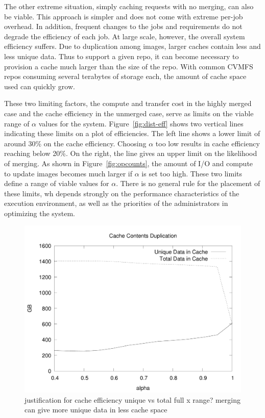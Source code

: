 \documentclass[sigconf]{acmart}
\begin{document}
The other extreme situation,
simply caching requests with no merging,
can also be viable.
This approach is simpler and does not come with extreme per-job overhead.
In addition, frequent changes to the jobs and requirements do not degrade the efficiency of each job.
At large scale, however,
the overall system efficiency suffers.
Due to duplication among images,
larger caches contain less and less unique data.
Thus to support a given repo,
it can become necessary to provision a cache much larger than the size of the repo.
With common CVMFS repos consuming several terabytes of storage each,
the amount of cache space used can quickly grow.

These two limiting factors,
the compute and transfer cost in the highly merged case and the cache efficiency in the unmerged case,
serve as limits on the viable range of $\alpha$ values for the system.
Figure~\ref{fig:dist-eff} shows two vertical lines indicating these limits on a plot of efficiencies.
The left line shows a lower limit of around 30\% on the cache efficiency.
Choosing $\alpha$ too low results in cache efficiency reaching below 20\%.
On the right, the line gives an upper limit on the likelihood of merging.
As shown in Figure~\ref{fig:opcounts},
the amount of I/O and compute to update images becomes much larger if $\alpha$ is set too high.
These two limits define a range of viable values for $\alpha$.
There is no general rule for the placement of these limits,
wh depends strongly on the performance characteristics of the execution environment,
as well as the priorities of the administrators in optimizing the system.


\begin{figure}
\includegraphics[width=\linewidth]{curated/comparative/cache_efficiency.pdf}
justification for cache efficiency
unique vs total
full x range?
merging can give more unique data in less cache space
\end{figure}
\end{document}
